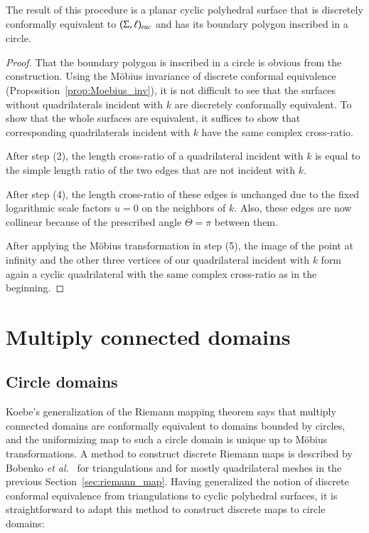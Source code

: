 \documentclass[Thesis]{subfiles}
\begin{document}
\begin{proposition}
  \label{prop:riemann_map}
  The result of this procedure is a planar cyclic polyhedral surface
  that is discretely conformally equivalent to $(\Sigma, \ell)_{\euc}$
  and has its boundary polygon inscribed in a circle.
\end{proposition}

\begin{proof}
  That the boundary polygon is inscribed in a circle is obvious from
  the construction.  Using the M{\"o}bius invariance of discrete
  conformal equivalence (Proposition~\ref{prop:Moebius_inv}), it is
  not difficult to see that the surfaces without quadrilaterals
  incident with $k$ are discretely conformally equivalent. To show
  that the whole surfaces are equivalent, it suffices to show that
  corresponding quadrilaterals incident with $k$ have the same complex
  cross-ratio.

  After step (2), the length cross-ratio of a quadrilateral incident with
  $k$ is equal to the simple length ratio of the two edges that are
  not incident with $k$. 

  After step (4), the length cross-ratio of these edges is unchanged due
  to the fixed logarithmic scale factors $u=0$ on the neighbors of
  $k$. Also, these edges are now collinear because of the prescribed
  angle $\Theta=\pi$ between them.

  After applying the M{\"o}bius transformation in step (5), the image of
  the point at infinity and the other three vertices of our
  quadrilateral incident with $k$ form again a cyclic quadrilateral
  with the same complex cross-ratio as in the beginning.
\end{proof}

\section{Multiply connected domains}
\label{sec:multiply_connected}

\subsection{Circle domains}
\label{sec:circle_domains}

Koebe's generalization of the Riemann mapping theorem says that
multiply connected domains are conformally equivalent to domains
bounded by circles, and the uniformizing map to such a circle domain
is unique up to M{\"o}bius transformations. A method to construct
discrete Riemann maps is described by Bobenko {\it et al.}\ \cite[Section
3.3]{BPS2015:dconf} for triangulations and for mostly quadrilateral meshes in
the previous Section~\ref{sec:riemann_map}. Having generalized the
notion of discrete conformal equivalence from triangulations to cyclic
polyhedral surfaces, it is straightforward to adapt this method to
construct discrete maps to circle domains: 
\end{document}
